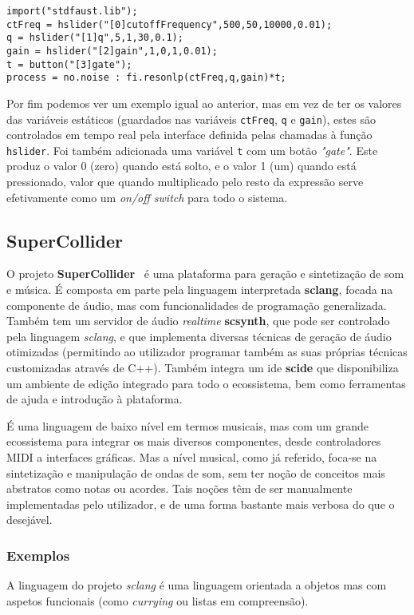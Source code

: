 \begin{lstlisting}[caption={Geração de ruído aleatório com um filtro \textit{low-pass} controlada por uma interface}]
import("stdfaust.lib");
ctFreq = hslider("[0]cutoffFrequency",500,50,10000,0.01);
q = hslider("[1]q",5,1,30,0.1);
gain = hslider("[2]gain",1,0,1,0.01);
t = button("[3]gate");
process = no.noise : fi.resonlp(ctFreq,q,gain)*t;
\end{lstlisting}
Por fim podemos ver um exemplo igual ao anterior, mas em vez de ter os valores das variáveis estáticos (guardados nas variáveis \texttt{ctFreq}, \texttt{q} e \texttt{gain}), estes são controlados em tempo real pela interface definida pelas chamadas à função \texttt{hslider}. Foi também adicionada uma variável \texttt{t} com um botão \textit{"gate"}. Este produz o valor 0 (zero) quando está solto, e o valor 1 (um) quando está pressionado, valor que quando multiplicado pelo resto da expressão serve efetivamente como um \textit{on/off switch} para todo o sistema.

\subsection{SuperCollider}
O projeto \textbf{SuperCollider}~\citep{doi:SuperCollider, orlarey:hal-02158894} é uma plataforma para geração e sintetização de som e música. É composta em parte pela linguagem interpretada \textbf{sclang}, focada na componente de áudio, mas com funcionalidades de programação generalizada. Também tem um servidor de áudio \textit{realtime} \textbf{scsynth}, que pode ser controlado pela linguagem \textit{sclang}, e que implementa diversas técnicas de geração de áudio otimizadas (permitindo ao utilizador programar também as suas próprias técnicas customizadas através de C++). Também integra um \acrshort{ide} \textbf{scide} que disponibiliza um ambiente de edição integrado para todo o ecossistema, bem como ferramentas de ajuda e introdução à plataforma.

É uma linguagem de baixo nível em termos musicais, mas com um grande ecossistema para integrar os mais diversos componentes, desde controladores MIDI a interfaces gráficas. Mas a nível musical, como já referido, foca-se na sintetização e manipulação de ondas de som, sem ter noção de conceitos mais abstratos como notas ou acordes. Tais noções têm de ser manualmente implementadas pelo utilizador, e de uma forma bastante mais verbosa do que o desejável.

\subsubsection{Exemplos}
A linguagem do projeto \textit{sclang} é uma linguagem orientada a objetos mas com aspetos funcionais (como \textit{currying} ou listas em compreensão).

